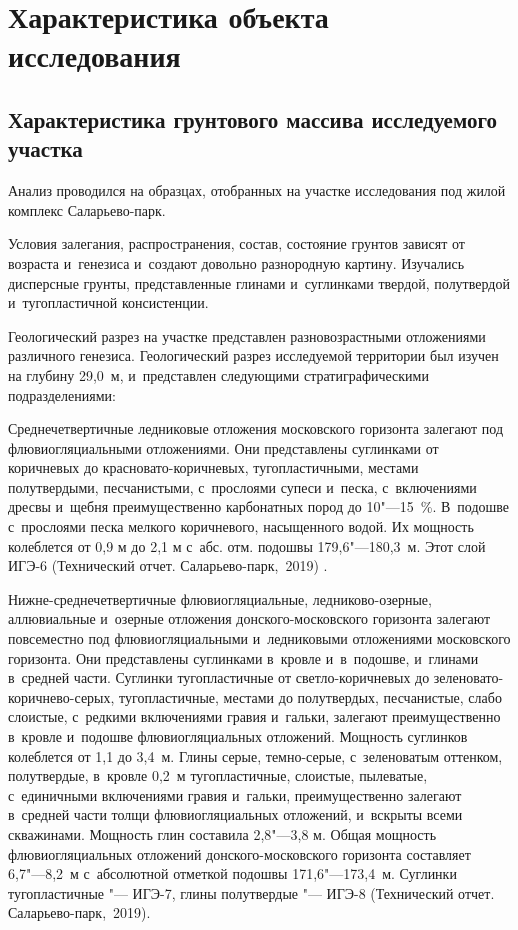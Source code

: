 \chapter{Характеристика объекта исследования}
\section{Характеристика грунтового массива исследуемого участка}
Анализ проводился на образцах, отобранных на участке исследования  под жилой комплекс Саларьево-парк.

Условия залегания, распространения, состав, состояние  грунтов зависят от возраста и~генезиса и~создают довольно разнородную картину. Изучались дисперсные грунты, представленные глинами и~суглинками твердой, полутвердой и~тугопластичной консистенции.


Геологический разрез на участке представлен разновозрастными отложениями различного генезиса.
Геологический разрез исследуемой территории был изучен на глубину 29,0~м, и~представлен следующими стратиграфическими подразделениями:

 Среднечетвертичные ледниковые отложения московского горизонта  залегают под флювиогляциальными отложениями.
 Они представлены суглинками от коричневых до красновато-коричневых, тугопластичными, местами полутвердыми, песчанистыми, с~прослоями супеси и~песка, с~включениями дресвы и~щебня преимущественно карбонатных пород до 10"---15~\%.
 В~подошве с~прослоями песка мелкого коричневого, насыщенного водой.
 Их мощность колеблется от 0,9 м до 2,1 м с~абс. отм. подошвы 179,6"---180,3~м.
 Этот слой ИГЭ-6 (Технический отчет. Саларьево-парк,~2019) \cite{moshkin2019}.

Нижне-среднечетвертичные флювиогляциальные, ледниково-озерные, аллювиальные и~озерные отложения донского-московского горизонта  залегают повсеместно под флювиогляциальными и~ледниковыми отложениями московского горизонта. 
Они представлены суглинками в~кровле и~в~подошве, и~глинами в~средней части. Суглинки тугопластичные от светло-коричневых до зеленовато-коричнево-серых, тугопластичные, местами до полутвердых, песчанистые, слабо слоистые, с~редкими включениями гравия и~гальки, залегают преимущественно в~кровле и~подошве флювиогляциальных отложений. 
Мощность суглинков колеблется от 1,1 до 3,4~м. 
Глины серые, темно-серые, с~зеленоватым оттенком, полутвердые, в~кровле 0,2~м тугопластичные, слоистые, пылеватые, с~единичными включениями гравия и~гальки, преимущественно залегают в~средней части толщи флювиогляциальных отложений, и~вскрыты всеми скважинами. 
Мощность глин составила 2,8"---3,8 м. 
Общая мощность флювиогляциальных отложений донского-московского горизонта составляет 6,7"---8,2~м с~абсолютной отметкой подошвы 171,6"---173,4~м. 
Суглинки тугопластичные "--- ИГЭ-7, глины полутвердые "--- ИГЭ-8 (Технический отчет. Саларьево-парк,~2019).

